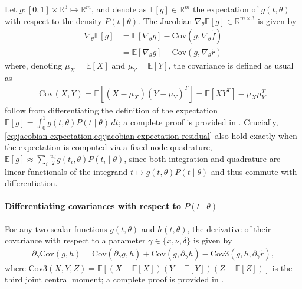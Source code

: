 \documentclass{article}
\begin{document}
Let $g : [0, 1] \times \mathbb{R}^3 \mapsto \mathbb{R}^m$, and denote as $\mathbb{E}[g] \in \mathbb{R}^m$ the expectation of $g(t, \theta)$ with respect to the density $P(t \mid \theta)$.
The Jacobian $\nabla_\theta \mathbb{E}[g] \in \mathbb{R}^{m \times 3}$ is given by
%
\begin{align}
  \nabla_\theta \mathbb{E}[g] & = \mathbb{E}[\nabla_\theta g] - \mathrm{Cov}(g, \nabla_\theta \tilde{f}) \label{eq:jacobian-expectation}          \\
                              & = \mathbb{E}[\nabla_\theta g] - \mathrm{Cov}(g, \nabla_\theta \tilde{r}) \label{eq:jacobian-expectation-residual}
\end{align}
%
where, denoting $\mu_X = \mathbb{E}[X]$ and $\mu_Y = \mathbb{E}[Y]$, the covariance is defined as usual as
%
\begin{align}
  \mathrm{Cov}(X, Y) = \mathbb{E}[(X - \mu_X)(Y - \mu_Y)^T] = \mathbb{E}[X Y^T] - \mu_X \mu_Y^T.
\end{align}
%
 follow from differentiating the definition of the expectation $\mathbb{E}[g] = \int_0^1 g(t, \theta) P(t \mid \theta) \, dt$;
a complete proof is provided in .
Crucially, \cref{eq:jacobian-expectation,eq:jacobian-expectation-residual} also hold exactly when the expectation is computed via a fixed-node quadrature, $\mathbb{E}[g] \approx \sum_i \frac{w_i}{2} g(t_i, \theta) P(t_i \mid \theta)$, since both integration and quadrature are linear functionals of the integrand $t \mapsto g(t,\theta) P(t \mid \theta)$ and thus commute with differentiation.

\paragraph{Differentiating covariances with respect to $P(t \mid \theta)$}\label{sec:derivative-covariance}

For any two scalar functions $g(t,\theta)$ and $h(t,\theta)$, the derivative of their covariance with respect to a parameter $\gamma \in \{x, \nu, \delta\}$ is given by
%
\begin{align}\label{eq:derivative-covariance-identity}
  \partial_{\gamma} \mathrm{Cov}(g, h) = \mathrm{Cov}(\partial_{\gamma} g, h) + \mathrm{Cov}(g, \partial_{\gamma} h) - \mathrm{Cov3}(g, h, \partial_{\gamma} \tilde{r}),
\end{align}
%
where $\mathrm{Cov3}(X,Y,Z) = \mathbb{E}[(X-\mathbb{E}[X])(Y-\mathbb{E}[Y])(Z-\mathbb{E}[Z])]$ is the third joint central moment;
a complete proof is provided in .
\end{document}
